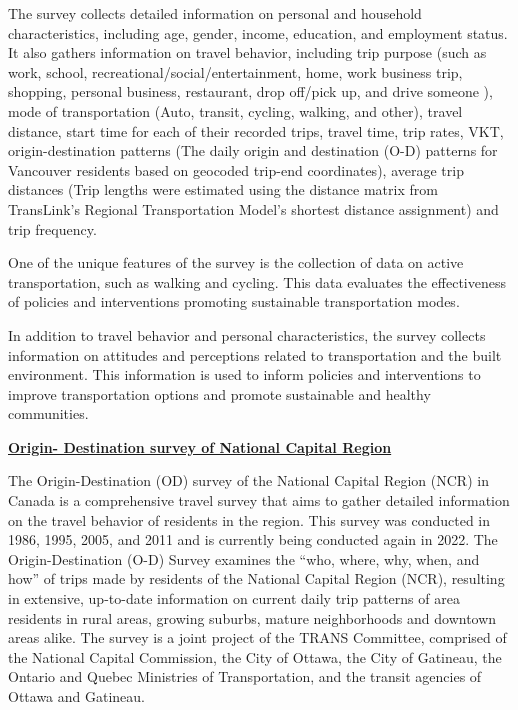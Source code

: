 \documentclass[12pt,twoside]{reedthesis}
\begin{document}
The survey collects detailed information on personal and household characteristics, including age, gender, income, education, and employment status. It also gathers information on travel behavior, including trip purpose (such as work, school, recreational/social/entertainment, home, work business trip, shopping, personal business, restaurant, drop off/pick up, and drive someone ), mode of transportation (Auto, transit, cycling, walking, and other), travel distance, start time for each of their recorded trips, travel time, trip rates, VKT, origin-destination patterns (The daily origin and destination (O-D) patterns for Vancouver residents based on geocoded trip-end coordinates), average trip distances (Trip lengths were estimated using the distance matrix from TransLink's Regional Transportation Model's shortest distance assignment) and trip frequency.

One of the unique features of the survey is the collection of data on active transportation, such as walking and cycling. This data evaluates the effectiveness of policies and interventions promoting sustainable transportation modes.

In addition to travel behavior and personal characteristics, the survey collects information on attitudes and perceptions related to transportation and the built environment. This information is used to inform policies and interventions to improve transportation options and promote sustainable and healthy communities.

\textbf{\href{http://www.ncr-trans-rcn.ca/surveys/o-d-survey}{Origin- Destination survey of National Capital Region}}

The Origin-Destination (OD) survey of the National Capital Region (NCR) in Canada is a comprehensive travel survey that aims to gather detailed information on the travel behavior of residents in the region. This survey was conducted in 1986, 1995, 2005, and 2011 and is currently being conducted again in 2022. The Origin-Destination (O-D) Survey examines the ``who, where, why, when, and how'' of trips made by residents of the National Capital Region (NCR), resulting in extensive, up-to-date information on current daily trip patterns of area residents in rural areas, growing suburbs, mature neighborhoods and downtown areas alike. The survey is a joint project of the TRANS Committee, comprised of the National Capital Commission, the City of Ottawa, the City of Gatineau, the Ontario and Quebec Ministries of Transportation, and the transit agencies of Ottawa and Gatineau.
\end{document}
